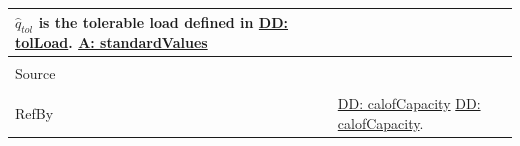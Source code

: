 \documentclass[12pt]{article}
\begin{document}
\begin{minipage}{\textwidth}
\begin{tabular}{p{} p{}}
                                                          ${\hat{q}_{tol}}$ is the tolerable load defined in \hyperref[DD:tolLoad]{DD: tolLoad}.
                                                          \hyperref[assumpSV]{A: standardValues}
                                                          \\ \midrule \\
                                                          Source & \cite{astm2009}
                                                                   \\ \midrule \\
                                                                   RefBy & \hyperref[DD:calofCapacity]{DD: calofCapacity} \hyperref[DD:calofCapacity]{DD: calofCapacity}.
\\ \bottomrule \end{tabular}
\end{minipage}
\par~
\end{document}
